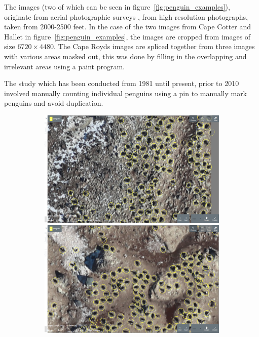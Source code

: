 The images (two of which can be seen in figure~\ref{fig:penguin_examples}), originate from aerial photographic surveys \cite{Lyver2014}, from high resolution photographs, taken from 2000-2500 feet. In the case of the two images from Cape Cotter and Hallet in figure~\ref{fig:penguin_examples}, the images are cropped from images of size $ 6720\times4480 $. The Cape Royds images are spliced together from three images with various areas masked out, this was done by filling in the overlapping and irrelevant areas using a paint program.

The study which has been conducted from 1981 until present, prior to 2010 involved manually counting individual penguins using a pin to manually mark penguins and avoid duplication. 

\begin{figure}[h!]
\centering
\begin{subfigure}[t]{1.0\linewidth}
  \includegraphics[width=0.475\linewidth]{figures/annotation/screenshots/penguins_aerial.png}
  \hfill
  \includegraphics[width=0.475\linewidth]{figures/annotation/screenshots/penguins_aerial2.png}
  \caption{}
\end{subfigure}

\caption{ }
\label {fig:penguin_aerial_examples}
\end{figure}




